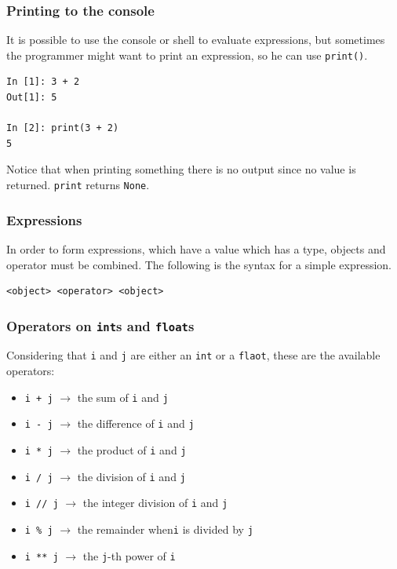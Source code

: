 \documentclass[a4paper]{article}
\newcommand{\inlinecode}{\texttt}
\begin{document}
\subsubsection{Printing to the console}

It is possible to use the console or shell to evaluate expressions, but
sometimes the programmer might want to print an expression, so he can use
\inlinecode{print()}.

\begin{lstlisting}
In [1]: 3 + 2
Out[1]: 5

In [2]: print(3 + 2)
5
\end{lstlisting}

Notice that when printing something there is no output since no value is
returned. \inlinecode{print} returns \inlinecode{None}.

\subsubsection{Expressions}

In order to form expressions, which have a value which has a type, objects and
operator must be combined. The following is the syntax for a simple expression.

\begin{lstlisting}
<object> <operator> <object>
\end{lstlisting}

\subsubsection{Operators on \inlinecode{int}s and \inlinecode{float}s}

Considering that \inlinecode{i} and \inlinecode{j} are either an
\inlinecode{int} or a \inlinecode{flaot}, these are the available operators:

\begin{itemize}
  \item \inlinecode{i + j} $\longrightarrow$ the sum of \inlinecode{i} and
        \inlinecode{j}
  \item \inlinecode{i - j} $\longrightarrow$ the difference of \inlinecode{i}
        and \inlinecode{j}
  \item \inlinecode{i * j} $\longrightarrow$ the product of \inlinecode{i} and
        \inlinecode{j}
  \item \inlinecode{i / j} $\longrightarrow$ the division of \inlinecode{i} and
        \inlinecode{j}
  \item \inlinecode{i // j} $\longrightarrow$ the integer division of
        \inlinecode{i} and \inlinecode{j}
  \item \inlinecode{i \% j} $\longrightarrow$ the remainder when\inlinecode{i}
        is divided by \inlinecode{j}
  \item \inlinecode{i ** j} $\longrightarrow$ the \inlinecode{j}-th power of
        \inlinecode{i}
\end{itemize}
\end{document}

